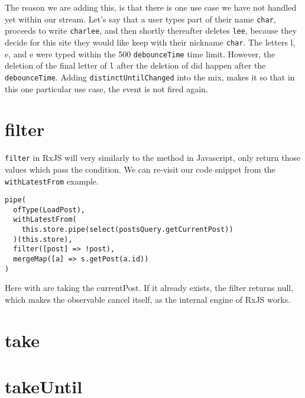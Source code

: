 The reason we are adding this, is that there is one use case we have not
handled yet within our stream. Let's say that a user types part of their 
name \texttt{char}, proceeds to write \texttt{charlee}, and then shortly
thereafter deletes \texttt{lee}, because they decide for this site they 
would like keep with their nickname \texttt{char}. The letters l, e, and
e were typed within the 500 \lstinline{debounceTime} time limit. However, 
the deletion of the final letter of \texttt{l} after the deletion of 
 did happen after the \lstinline{debounceTime}. Adding 
\lstinline{distinctUntilChanged} into the mix, makes it so that in this one 
particular use case, the event is not fired again. 

\section{filter} 
\lstinline{filter} in RxJS will very similarly to the method in Javascript, 
only return those values which pass the condition. We can re-visit our code
snippet from the \lstinline{withLatestFrom} example.

\begin{lstlisting}[caption=data-access-post.ts]
pipe(
  ofType(LoadPost),
  withLatestFrom(
    this.store.pipe(select(postsQuery.getCurrentPost))
  )(this.store),
  filter([post] => !post),
  mergeMap([a] => s.getPost(a.id))
)
\end{lstlisting}  

Here with are taking the currentPost. If it already exists, the filter 
returns null, which makes the observable cancel itself, as the internal 
engine of RxJS works.

\section{take} 

\section{takeUntil}